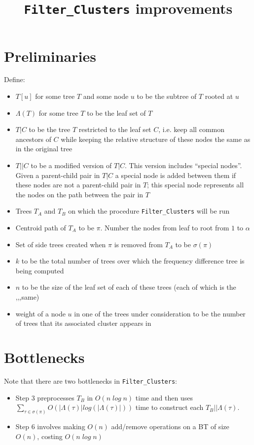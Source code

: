 \documentclass{article}
\title{\texttt{Filter\_Clusters} improvements}
\begin{document}
    \maketitle

    \section{Preliminaries}
    Define:
    \begin{itemize}
        \item $T[u]$ for some tree $T$ and some node $u$ to be the subtree of $T$ rooted at $u$
        \item $\Lambda(T)$ for some tree $T$ to be the leaf set of $T$
        \item $T|C$ to be the tree $T$ restricted to the leaf set $C$, i.e. keep all common ancestors of $C$ while keeping the relative structure of these nodes the same as in the original tree
        \item $T||C$ to be a modified version of $T|C$. This version includes ``special nodes''. Given a parent-child pair in $T|C$ a special node is added between them if these nodes are not a parent-child pair in $T$; this special node represents all the nodes on the path between the pair in $T$
        \item Trees $T_A$ and $T_B$ on which the procedure \texttt{Filter\_Clusters} will be run
        \item Centroid path of $T_A$ to be $\pi$. Number the nodes from leaf to root from $1$ to $\alpha$
        \item Set of side trees created when $\pi$ is removed from $T_A$ to be $\sigma(\pi)$
        \item $k$ to be the total number of trees over which the frequency difference tree is being computed
        \item $n$ to be the size of the leaf set of each of these trees (each of which is the ,,,same)
        \item weight of a node $u$ in one of the trees under consideration to be the number of trees that its associated cluster appears in
    \end{itemize}

    \section{Bottlenecks}

    Note that there are two bottlenecks in \texttt{Filter\_Clusters}:
    \begin{itemize}
        \item Step 3 preprocesses $T_B$ in $O(n\;log\;n)$ time and then uses $\sum_{\tau\in\sigma(\pi)}O(|\Lambda(\tau)|log(|\Lambda(\tau)|))$ time to construct each $T_B||\Lambda(\tau)$.

        \item Step 6 involves making $O(n)$ add/remove operations on a BT of size $O(n)$, costing $O(n\;log\;n)$
    \end{itemize}
\end{document}
